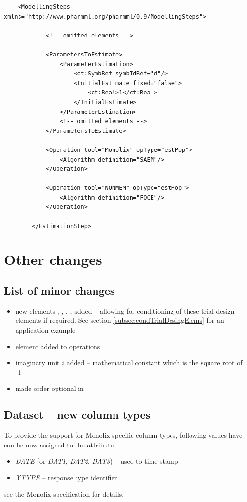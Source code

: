 \lstset{language=XML}
\begin{lstlisting}
    <ModellingSteps xmlns="http://www.pharmml.org/pharmml/0.9/ModellingSteps">
        
            <!-- omitted elements -->
            
            <ParametersToEstimate>
                <ParameterEstimation>
                    <ct:SymbRef symbIdRef="d"/>
                    <InitialEstimate fixed="false">
                        <ct:Real>1</ct:Real>
                    </InitialEstimate>
                </ParameterEstimation>
                <!-- omitted elements -->
            </ParametersToEstimate>
            
            <Operation tool="Monolix" opType="estPop">
                <Algorithm definition="SAEM"/>
            </Operation>
            
            <Operation tool="NONMEM" opType="estPop">
                <Algorithm definition="FOCE"/>
            </Operation>
            
        </EstimationStep>
\end{lstlisting}


\section{Other changes}
\label{sec:otherChanges}

\subsection{List of minor changes}

\begin{itemize}
\item 
new elements , , 
, ,  added -- allowing 
for conditioning of these trial design elements if required. See section \ref{subsec:condTrialDesingElems}
for an application example
\item
{} element added to operations
\item
imaginary unit $i$ added -- mathematical constant which is the square root of -1
\item
made order optional in 
\end{itemize}

\subsection{Dataset -- new column types}
\label{subsec:dataSets}
To provide the support for Monolix specific column types, 
following values have can be now assigned to the  
attribute
\begin{itemize}
\item 
\emph{DATE} (or \emph{DAT1}, \emph{DAT2}, \emph{DAT3}) -- used to time stamp
\item 
\emph{YTYPE} -- response type identifier
\end{itemize}
see the Monolix specification for details.


%
%
%
%
